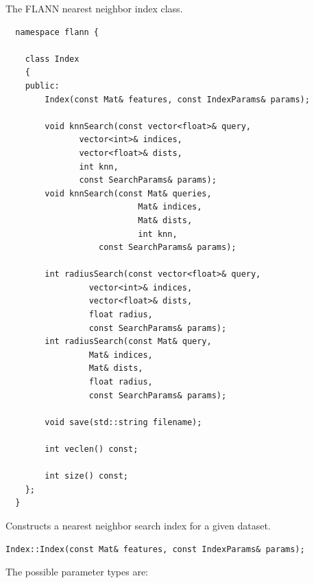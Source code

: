 \label{flann::Index}
The FLANN nearest neighbor index class.
\begin{lstlisting}
  namespace flann {

    class Index 
    {
    public:
	    Index(const Mat& features, const IndexParams& params);

	    void knnSearch(const vector<float>& query, 
			   vector<int>& indices, 
			   vector<float>& dists, 
			   int knn, 
			   const SearchParams& params);
	    void knnSearch(const Mat& queries, 
                           Mat& indices, 
                           Mat& dists, 
                           int knn, 
		           const SearchParams& params);

	    int radiusSearch(const vector<float>& query, 
			     vector<int>& indices, 
			     vector<float>& dists, 
			     float radius, 
			     const SearchParams& params);
	    int radiusSearch(const Mat& query, 
			     Mat& indices, 
			     Mat& dists, 
			     float radius, 
			     const SearchParams& params);

	    void save(std::string filename);

	    int veclen() const;

	    int size() const;
    };
  }
\end{lstlisting}

\label{flann::Index::Index}
Constructs a nearest neighbor search index for a given dataset.
\begin{lstlisting}
Index::Index(const Mat& features, const IndexParams& params);
\end{lstlisting}
\begin{description}
\end{description}

The possible parameter types are:

